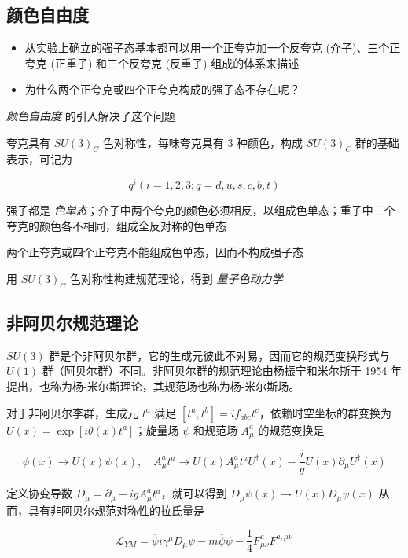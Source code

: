 \subsection{颜色自由度}

\begin{itemize}
    \item 从实验上确立的强子态基本都可以用一个正夸克加一个反夸克 (介子)、三个正夸克 (正重子) 和三个反夸克 (反重子) 组成的体系来描述
    \item 为什么两个正夸克或四个正夸克构成的强子态不存在呢？
\end{itemize}

\emph{颜色自由度} 的引入解决了这个问题

夸克具有 $SU(3)_C$ 色对称性，每味夸克具有 $3$ 种颜色，构成 $SU(3)_C$ 群的基础表示，可记为

\begin{equation}
    q^i (i = 1, 2, 3; q = d, u, s, c, b, t)
\end{equation}

强子都是 \emph{色单态}；介子中两个夸克的颜色必须相反，以组成色单态；重子中三个夸克的颜色各不相同，组成全反对称的色单态

两个正夸克或四个正夸克不能组成色单态，因而不构成强子态

用 $SU(3)_C$ 色对称性构建规范理论，得到 \emph{量子色动力学}

\subsection{非阿贝尔规范理论}

$SU(3)$ 群是个非阿贝尔群，它的生成元彼此不对易，因而它的规范变换形式与 $U(1)$ 群（阿贝尔群）不同。非阿贝尔群的规范理论由杨振宁和米尔斯于 1954 年提出，也称为杨-米尔斯理论，其规范场也称为杨-米尔斯场。

对于非阿贝尔李群，生成元 $t^a$ 满足 $[t^a, t^b] = i f_{abc} t^c$，依赖时空坐标的群变换为 $U(x) = \exp[i\theta(x) t^a]$；旋量场 $\psi$ 和规范场 $A^a_\mu$ 的规范变换是

\begin{equation}
    \psi(x) \to U(x) \psi(x), \quad A_\mu^a t^a \to U(x) A_\mu^a t^a U^\dagger(x) - \frac{i}{g} U(x) \partial_\mu U^\dagger(x)
\end{equation}

定义协变导数 $D_\mu = \partial_\mu + ig A^a_\mu t^a$，就可以得到 $D_\mu \psi(x) \to U(x) D_\mu \psi(x)$ 从而，具有非阿贝尔规范对称性的拉氏量是

\begin{equation}
    \mathcal{L}_{YM} = \overline{\psi} i \gamma^\mu D_\mu \psi - m \overline{\psi} \psi - \frac{1}{4} F_{\mu\nu}^a F^{a,\mu\nu}
\end{equation}

